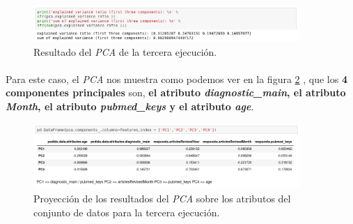 \begin{figure}[!htb]
  \centering
    \includegraphics[width=0.9\textwidth]{images/resultados_procesado_de_datos_pca3_result.png}
    \caption{Resultado del \textit{PCA} de la tercera ejecución.}
  \label{pcaThreeResult}
\end{figure}

\paragraph{}
Para este caso, el \textit{PCA} nos muestra como podemos ver en la figura \ref{pcaThreeAtributos} , que los \textbf{4 componentes principales} son, \textbf{el atributo \textit{diagnostic\_main}, el atributo \textit{Month}, el atributo \textit{pubmed\_keys} y el atributo \textit{age}}.

\begin{figure}[!htb]
  \centering
    \includegraphics[width=0.9\textwidth]{images/resultados_procesado_de_datos_pca3_atributos.png}
    \caption{Proyección de los resultados del \textit{PCA} sobre los atributos del conjunto de datos para la tercera ejecución.}
  \label{pcaThreeAtributos}
\end{figure}

